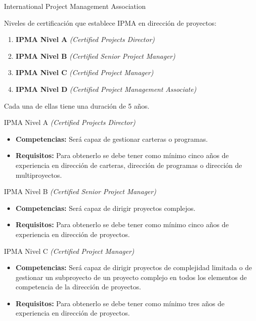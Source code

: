 \begin{frame}[allowframebreaks]{International Project Management Association}
	\framebreak
	
	Niveles de certificación que establece IPMA en dirección de proyectos:
	
	\begin{enumerate}
		\item \textbf{IPMA Nivel A} \emph{(Certified Projects Director)}
		\item \textbf{IPMA Nivel B} \emph{(Certified Senior Project Manager)}
		\item \textbf{IPMA Nivel C} \emph{(Certified Project Manager)}
		\item \textbf{IPMA Nivel D} \emph{(Certified Project Management Associate)}
	\end{enumerate}
	
	Cada una de ellas tiene una duración de 5 años.
	
	\framebreak
	
	\begin{block}{IPMA Nivel A \emph{(Certified Projects Director)}}
		\begin{itemize}
			\item \textbf{Competencias:} Será capaz de gestionar carteras o programas.
			\item \textbf{Requisitos:} Para obtenerlo se debe tener como mínimo cinco años de experiencia en dirección de carteras, dirección de programas o dirección de multiproyectos.
		\end{itemize}
	\end{block}
	
		\begin{block}{IPMA Nivel B \emph{(Certified Senior Project Manager)}}
			\begin{itemize}
				\item \textbf{Competencias:} Será capaz de dirigir proyectos complejos.
				\item \textbf{Requisitos:} Para obtenerlo se debe tener como mínimo cinco años de experiencia en dirección de proyectos.
			\end{itemize}
		\end{block}
	
	\framebreak
	
	\begin{block}{IPMA Nivel C \emph{(Certified Project Manager)}}
		\begin{itemize}
			\item \textbf{Competencias:} Será capaz de dirigir proyectos de complejidad limitada o de gestionar un subproyecto de un proyecto complejo en todos los elementos de competencia de la dirección de proyectos.
			\item \textbf{Requisitos:} Para obtenerlo se debe tener como mínimo tres años de experiencia en dirección de proyectos.
		\end{itemize}
	\end{block}
	

\end{frame}
